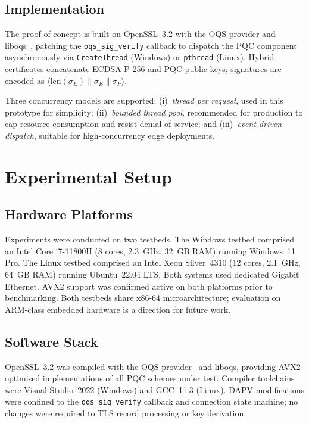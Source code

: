 \documentclass[preprint,10pt,3p]{elsarticle}
\begin{document}
\subsection{Implementation}
\label{sec:impl}

The proof-of-concept is built on OpenSSL~3.2 with the OQS provider and
liboqs~\cite{OQS2017}, patching the \texttt{oqs\_sig\_verify} callback to
dispatch the PQC component asynchronously via \texttt{CreateThread} (Windows)
or \texttt{pthread} (Linux).  Hybrid certificates concatenate ECDSA P-256 and
PQC public keys; signatures are encoded as
$\langle\mathrm{len}(\sigma_E)\|\sigma_E\|\sigma_P\rangle$.

Three concurrency models are supported: (i)~\textit{thread per request}, used
in this prototype for simplicity; (ii)~\textit{bounded thread pool}, recommended
for production to cap resource consumption and resist denial-of-service;
and (iii)~\textit{event-driven dispatch}, suitable for high-concurrency edge
deployments.

\section{Experimental Setup}
\label{sec:setup}

\subsection{Hardware Platforms}

Experiments were conducted on two testbeds.  The Windows testbed comprised an
Intel Core i7-11800H (8 cores, 2.3~GHz, 32~GB RAM) running Windows~11 Pro.
The Linux testbed comprised an Intel Xeon Silver~4310 (12 cores, 2.1~GHz,
64~GB RAM) running Ubuntu~22.04 LTS.  Both systems used dedicated Gigabit
Ethernet.  AVX2 support was confirmed active on both platforms prior to
benchmarking.  Both testbeds share x86-64 microarchitecture; evaluation on
ARM-class embedded hardware is a direction for future work.

\subsection{Software Stack}

OpenSSL~3.2 was compiled with the OQS provider~\cite{OQS2017} and liboqs,
providing AVX2-optimised implementations of all PQC schemes under test.
Compiler toolchains were Visual Studio~2022 (Windows) and GCC~11.3 (Linux).
DAPV modifications were confined to the \texttt{oqs\_sig\_verify} callback and
connection state machine; no changes were required to TLS record processing or
key derivation.
\end{document}
